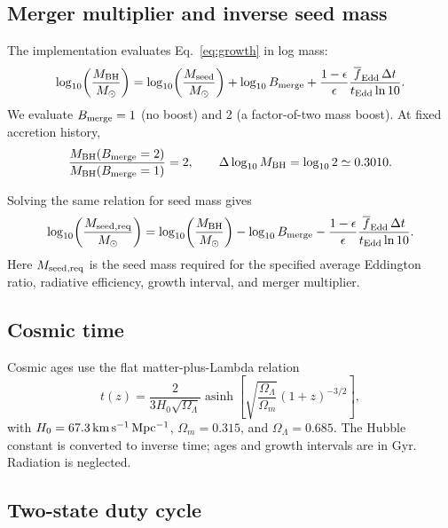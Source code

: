 \documentclass[11pt]{article}
\newcommand{\mbh}{M_{\mathrm{BH}}}
\newcommand{\mseed}{M_{\mathrm{seed}}}
\begin{document}
\subsection{Merger multiplier and inverse seed mass}

The implementation evaluates Eq.~\ref{eq:growth} in log mass:
\begin{equation}
\log_{10}\!\left(\frac{\mbh}{M_\odot}\right)
=\log_{10}\!\left(\frac{\mseed}{M_\odot}\right)
+\log_{10}B_{\rm merge}
+\frac{1-\epsilon}{\epsilon}
\frac{\overline{f}_{\mathrm{Edd}}\,\Delta t}{t_{\rm Edd}\ln 10}.
\label{eq:merger-implementation}
\end{equation}
We evaluate $B_{\rm merge}=1$ (no boost) and 2 (a factor-of-two mass boost).
At fixed accretion history,
\begin{equation}
\frac{\mbh(B_{\rm merge}=2)}{\mbh(B_{\rm merge}=1)}=2,
\qquad \Delta\log_{10}\mbh=\log_{10}2\simeq0.3010.
\label{eq:merger-shift}
\end{equation}

Solving the same relation for seed mass gives
\begin{equation}
\log_{10}\!\left(\frac{M_{\rm seed,req}}{M_\odot}\right)
=\log_{10}\!\left(\frac{\mbh}{M_\odot}\right)-\log_{10}B_{\rm merge}
-\frac{1-\epsilon}{\epsilon}
\frac{\overline{f}_{\mathrm{Edd}}\,\Delta t}{t_{\rm Edd}\ln 10}.
\label{eq:required-seed}
\end{equation}
Here $M_{\rm seed,req}$ is the seed mass required for the specified average
Eddington ratio, radiative efficiency, growth interval, and merger multiplier.

\subsection{Cosmic time}

Cosmic ages use the flat matter-plus-Lambda relation
\begin{equation}
t(z)=\frac{2}{3H_0\sqrt{\Omega_\Lambda}}
\operatorname{asinh}\!\left[\sqrt{\frac{\Omega_\Lambda}{\Omega_m}}
(1+z)^{-3/2}\right],
\label{eq:cosmictime}
\end{equation}
with $H_0=67.3\,{\rm km\,s^{-1}\,Mpc^{-1}}$, $\Omega_m=0.315$, and
$\Omega_\Lambda=0.685$. The Hubble constant is converted to inverse time;
ages and growth intervals are in Gyr. Radiation is neglected.

\subsection{Two-state duty cycle}
\end{document}
